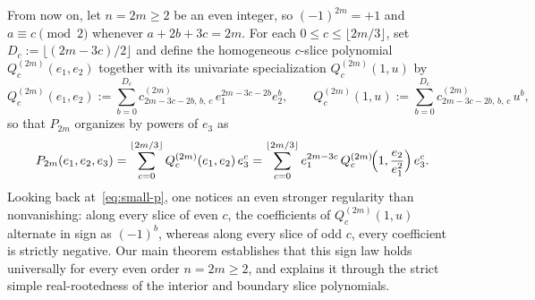 \documentclass[10pt]{article}
\numberwithin{equation}{section}
\theoremstyle{plain}
\theoremstyle{definition}
\newcommand{\1}{\mathbf{1}}
\begin{document}
From now on, let $n = 2m \ge 2$ be an even integer, so $(-1)^{2m} = +1$ and $a \equiv c \pmod{2}$ whenever $a + 2b + 3c = 2m$. For each $0 \le c \le \lfloor 2m/3 \rfloor$, set $D_c := \lfloor (2m - 3c)/2 \rfloor$ and define the homogeneous $c$-slice polynomial $Q_c^{(2m)}(e_1, e_2)$ together with its univariate specialization $Q_c^{(2m)}(1, u)$ by
\begin{equation}\label{eq:Qc-def}
Q_c^{(2m)}(e_1, e_2) := \sum_{b=0}^{D_c} c_{2m-3c-2b,\, b,\, c}^{(2m)}\, e_1^{2m-3c-2b} e_2^b,
\qquad
Q_c^{(2m)}(1, u) := \sum_{b=0}^{D_c} c_{2m-3c-2b,\, b,\, c}^{(2m)}\, u^b,
\end{equation}
so that $P_{2m}$ organizes by powers of $e_3$ as
\begin{equation}\label{eq:P-slice}
P_{2m}(e_1, e_2, e_3) = \sum_{c=0}^{\lfloor 2m/3 \rfloor} Q_c^{(2m)}(e_1, e_2)\, e_3^c
= \sum_{c=0}^{\lfloor 2m/3 \rfloor} e_1^{2m-3c}\, Q_c^{(2m)}\!\Bigl(1, \frac{e_2}{e_1^2}\Bigr)\, e_3^c.
\end{equation}
Looking back at~\eqref{eq:small-p}, one notices an even stronger regularity than nonvanishing: along every slice of even $c$, the coefficients of $Q_c^{(2m)}(1, u)$ alternate in sign as $(-1)^b$, whereas along every slice of odd $c$, every coefficient is strictly negative. Our main theorem establishes that this sign law holds universally for every even order $n = 2m \ge 2$, and explains it through the strict simple real-rootedness of the interior and boundary slice polynomials.
\end{document}

